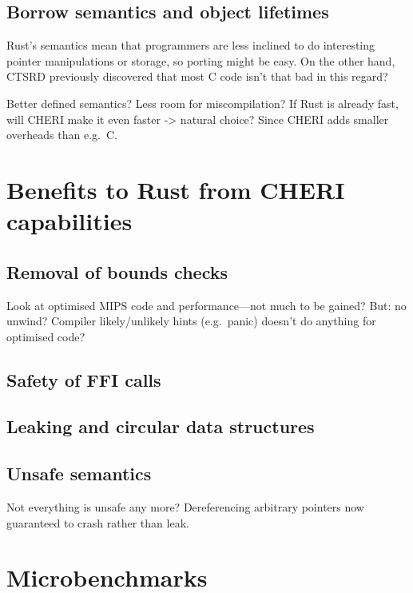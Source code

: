 \documentclass[dissertation.tex]{subfiles}
\begin{document}
\subsection{Borrow semantics and object lifetimes}
Rust's semantics mean that programmers are less inclined to do
interesting pointer manipulations or storage, so porting might be easy.
On the other hand, CTSRD previously discovered that most C code isn't
that bad in this regard?

Better defined semantics? Less room for miscompilation?
If Rust is already fast, will CHERI make it even faster -> natural
choice? Since CHERI adds smaller overheads than e.g.~C.


\section{Benefits to Rust from CHERI capabilities}
\label{sec:eval-rust}

\subsection{Removal of bounds checks}
Look at optimised MIPS code and performance---not much to be gained?
But: no unwind? 
Compiler likely/unlikely hints (e.g.~panic) doesn't do anything for optimised code?


\subsection{Safety of FFI calls}


\subsection{Leaking and circular data structures}


\subsection{Unsafe semantics}
Not everything is unsafe any more? Dereferencing arbitrary pointers now
guaranteed to crash rather than leak.


\section{Microbenchmarks}
\end{document}
